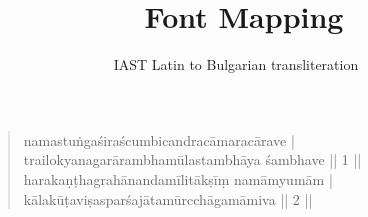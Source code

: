 \documentclass[a4paper,oneside,12pt]{article}
\title{\XeTeX\ Font Mapping}
\author{IAST Latin to Bulgarian transliteration}
\date{\relax}
\newcommand{\sa}[1]{\textbulgarian{\bulgarianfont#1}}
\begin{document}
\maketitle
\thispagestyle{empty}
\bigskip

\begin{verse}
  \sa{namastuṅgaśiraścumbicandracāmaracārave |\\
    trailokyanagarārambhamūlastambhāya śambhave || 1 ||\\
    harakaṇṭhagrahānandamīlitākṣīṃ namāmyumām |\\
    kālakūṭaviṣasparśajātamūrcchāgamāmiva || 2 ||
  }
\end{verse}
\end{document}
